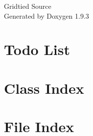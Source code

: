 \documentclass[twoside]{book}
\newcommand{\+}{\discretionary{\mbox{\scriptsize$\hookleftarrow$}}{}{}}
\newcommand{\clearemptydoublepage}{%
    \newpage{\pagestyle{empty}\cleardoublepage}%
  }
\begin{document}
  \raggedbottom
    \hypersetup{pageanchor=false,
                bookmarksnumbered=true,
                pdfencoding=unicode
               }
  \begin{titlepage}
  \vspace*{7cm}
  \begin{center}%
  {\Large Gridtied Source}\\
  \vspace*{1cm}
  {\large Generated by Doxygen 1.9.3}\\
  \end{center}
  \end{titlepage}
  \clearemptydoublepage
  \tableofcontents
  \clearemptydoublepage
  \hypersetup{pageanchor=true}
\chapter{Todo List}
\label{todo}

\chapter{Class Index}

\chapter{File Index}

\end{document}
